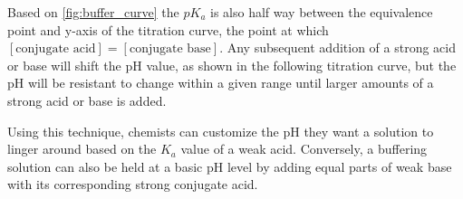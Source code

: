 \documentclass[10pt]{article}
\begin{document}
  Based on \autoref{fig:buffer_curve} the $pK_a$ is also half way between the equivalence point and y-axis of the titration curve, the point at which $[\text{conjugate acid}] = [\text{conjugate base}]$. Any subsequent addition of a strong acid or base will shift the pH value, as shown in the following titration curve, but the pH will be resistant to change within a given range until larger amounts of a strong acid or base is added.

  Using this technique, chemists can customize the pH they want a solution to linger around based on the $K_a$ value of a weak acid. Conversely, a buffering solution can also be held at a basic pH level by adding equal parts of weak base with its corresponding strong conjugate acid.
 
\end{document}

